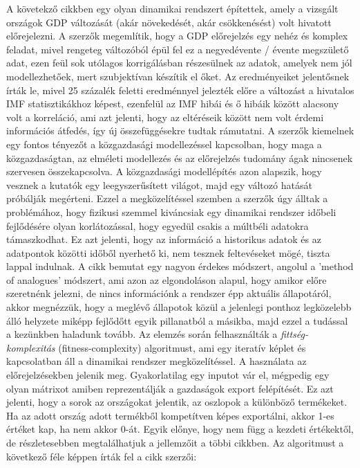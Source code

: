 \documentclass{article}
\theoremstyle{definition}
\theoremstyle{theorem}
\begin{document}
\newline A követekző cikkben \cite{Tacchella} egy olyan dinamikai rendszert építettek, amely a vizsgált országok GDP változását (akár növekedését, akár csökkenésést) volt hivatott előrejelezni. A szerzők megemlítik, hogy a GDP előrejelzés egy nehéz és komplex feladat, mivel rengeteg változóból épül fel ez a negyedévente / évente megszülető adat, ezen feül sok utólagos korrigálásban részesülnek az adatok, amelyek nem jól modellezhetőek, mert szubjektívan készítik el őket. Az eredményeiket jelentősnek írták le, mivel 25 százalék feletti eredménnyel jelezték előre a változást a hivatalos IMF statisztikákhoz képest, ezenfelül az IMF hibái és ő hibáik között alacsony volt a korreláció, ami azt jelenti, hogy az eltéréseik között nem volt érdemi információs átfedés, így új összefüggésekre tudtak rámutatni. A szerzők kiemelnek egy fontos tényezőt a közgazdasági modellezéssel kapcsolban, hogy maga a közgazdaságtan, az elméleti modellezés és az előrejelzés tudomány ágak nincsenek szervesen összekapcsolva. A közgazdasági modellépítés azon alapszik, hogy vesznek a kutatók egy leegyszerűsített világot, majd egy változó hatását próbálják megérteni. Ezzel a megközelítéssel szemben a szerzők úgy álltak a problémához, hogy fizikusi szemmel kiváncsiak egy dinamikai rendszer időbeli fejlődésére olyan korlátozással, hogy egyedül csakis a múltbéli adatokra támaszkodhat. Ez azt jelenti, hogy az információ a historikus adatok és az adatpontok közötti időből nyerhető ki, nem tesznek feltevéseket mögé, tiszta lappal indulnak. A cikk bemutat egy nagyon érdekes módszert, angolul a 'method of analogues' módszert, ami azon az elgondoláson alapul, hogy amikor előre szeretnénk jelezni, de nincs információnk a rendszer épp aktuális állapotáról, akkor megnézzük, hogy a meglévő állapotok közül a jelenlegi ponthoz legközelebb álló helyzete miképp fejlődőtt egyik pillanatból a másikba, majd ezzel a tudással a kezünkben haladunk tovább. Az elemzés során felhasználták a \textit{fittség-komplexitás} (fitness-complexity) algoritmust, ami egy iteratív képlet és kapcsolatban áll a dinamikai rendszer megközelítéssel. A használata az előrejelzésekben jelenik meg. Gyakorlatilag egy inputot vár el, mégpedig egy olyan mátrixot amiben reprezentálják a gazdaságok export felépítését. Ez azt jelenti, hogy a sorok az országokat jelentik, az oszlopok a különböző termékeket. Ha az adott ország adott termékből kompetítven képes exportálni, akkor 1-es értéket kap, ha nem akkor 0-át. Egyik előnye, hogy nem függ a kezdeti értékektől, de részletesebben megtalálhatjuk a jellemzőit a többi cikkben. Az algoritmust a következő féle képpen írták fel a cikk szerzői:
\end{document}
